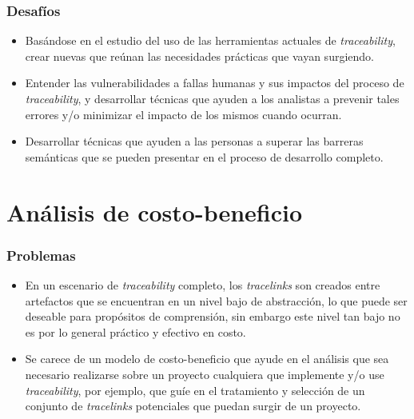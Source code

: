 \documentclass[a4paper,12pt,oneside,spanish]{book}
\begin{document}
\subsubsection{Desafíos}

\begin{itemize}[label={\checkmark}]

\item Basándose en el estudio del uso de las herramientas actuales de \textit{traceability}, crear nuevas que reúnan las necesidades prácticas que vayan surgiendo.

\item Entender las vulnerabilidades a fallas humanas y sus impactos del proceso de \textit{traceability}, y desarrollar técnicas que ayuden a los analistas a prevenir tales errores y/o minimizar el impacto de los mismos cuando ocurran.

\item Desarrollar técnicas que ayuden a las personas a superar las barreras semánticas que se pueden presentar en el proceso de desarrollo completo.

\end{itemize}

\section{Análisis de costo-beneficio}

\subsubsection{Problemas}

\begin{itemize}[label={$\times$}]

\item En un escenario de \textit{traceability} completo, los \textit{tracelinks} son creados entre artefactos que se encuentran en un nivel bajo de abstracción, lo que puede ser deseable para propósitos de comprensión, sin embargo este nivel tan bajo no es por lo general práctico y efectivo en costo.


\item Se carece de un modelo de costo-beneficio que ayude en el análisis que sea necesario realizarse sobre un proyecto cualquiera que implemente y/o use \textit{traceability}, por ejemplo, que guíe en el tratamiento y selección de un conjunto de \textit{tracelinks} potenciales que puedan surgir de un proyecto.

\end{itemize}
\end{document}

